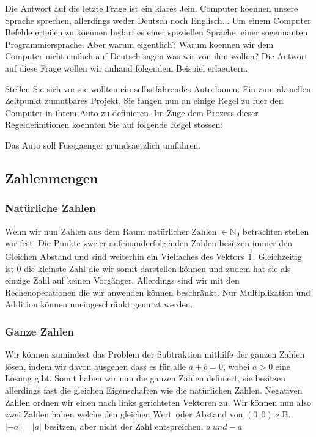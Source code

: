 \documentclass[a4paper, 12pt]{article}
\begin{document}
Die Antwort auf die letzte Frage ist ein klares Jein. Computer koennen
unsere Sprache sprechen, allerdings weder Deutsch noch Englisch...
Um einem Computer Befehle erteilen zu koennen bedarf es einer
speziellen Sprache, einer sogennanten Programmiersprache.
Aber warum eigentlich? Warum koennen wir dem Computer nicht einfach
auf Deutsch sagen was wir von ihm wollen?
Die Antwort auf diese Frage wollen wir anhand folgendem Beispiel erlaeutern.

Stellen Sie sich vor sie wollten ein selbstfahrendes Auto bauen. Ein zum aktuellen Zeitpunkt zumutbares Projekt. Sie fangen nun an einige Regel zu fuer den Computer in ihrem Auto zu definieren.
Im Zuge dem Prozess dieser Regeldefinitionen koennten Sie auf folgende
Regel stossen:

Das Auto soll Fussgaenger grundsaetzlich umfahren.

\subsection{Zahlenmengen}

\subsubsection{Natürliche Zahlen}
Wenn wir nun Zahlen aus dem Raum natürlicher Zahlen $\in \mathbb{N}_0$ betrachten stellen wir fest:
Die Punkte zweier aufeinanderfolgenden Zahlen besitzen immer den Gleichen Abstand und sind weiterhin ein Vielfaches des Vektors $\vec{1}$. Gleichzeitig ist $0$ die kleinste Zahl die wir somit darstellen können und zudem hat sie als einzige Zahl auf keinen Vorgänger.
Allerdings sind wir mit den Rechenoperationen die wir anwenden können beschränkt. Nur Multiplikation und Addition können uneingeschränkt genutzt werden. \cite{mengen}

\subsubsection{Ganze Zahlen}
Wir können zumindest das Problem der Subtraktion mithilfe der ganzen Zahlen lösen, indem wir davon ausgehen dass es für alle $a + b = 0$, wobei $a > 0$ eine Lösung gibt.
Somit haben wir nun die ganzen Zahlen definiert, sie besitzen allerdings fast die gleichen Eigenschaften wie die natürlichen Zahlen.
Negativen Zahlen ordnen wir einen nach links gerichteten Vektoren zu. Wir können nun also zwei Zahlen haben welche den gleichen \glqq Wert\grqq \ oder Abstand von $(0,0)$ z.B. $|-a| = |a|$ besitzen, aber nicht der  Zahl entspreichen. $a\ und -a$
\end{document}
